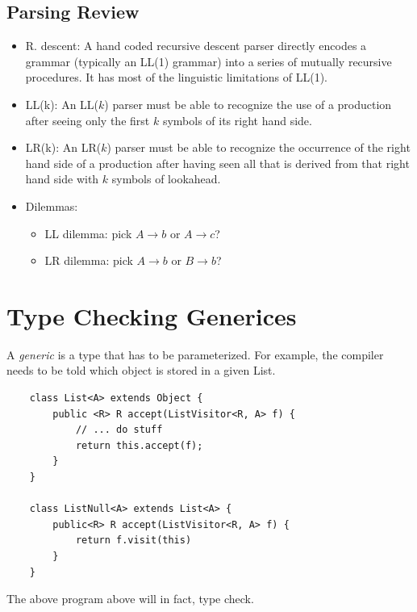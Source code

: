\documentclass[10pt]{article}
\begin{document}
\subsection*{Parsing Review}
\begin{itemize}
    \item R. descent: A hand coded recursive descent parser directly encodes a grammar (typically an LL(1) grammar) into a series of mutually recursive procedures.  It has most of the linguistic limitations of LL(1).
    \item LL(k): An LL($k$) parser must be able to recognize the use of a production after seeing only the first $k$ symbols of its right hand side.
    \item LR(k): An LR($k$) parser must be able to recognize the occurrence of the right hand side of a production after having seen all that is derived from that right hand side with $k$ symbols of lookahead.
    \item Dilemmas:
    \begin{itemize}
        \item LL dilemma: pick $A \rightarrow b$ or $A \rightarrow c$?
        \item LR dilemma: pick $A \rightarrow b$ or $B \rightarrow b$?
    \end{itemize}
\end{itemize}

\section*{Type Checking Generices}
A \textit{generic} is a type that has to be parameterized.  For example, the compiler needs to be told which object is stored in a given List.

\begin{verbatim}
    class List<A> extends Object {
        public <R> R accept(ListVisitor<R, A> f) {
            // ... do stuff
            return this.accept(f);
        }
    }

    class ListNull<A> extends List<A> {
        public<R> R accept(ListVisitor<R, A> f) {
            return f.visit(this)
        }
    }

\end{verbatim}
The above program above will in fact, type check.
\end{document}
